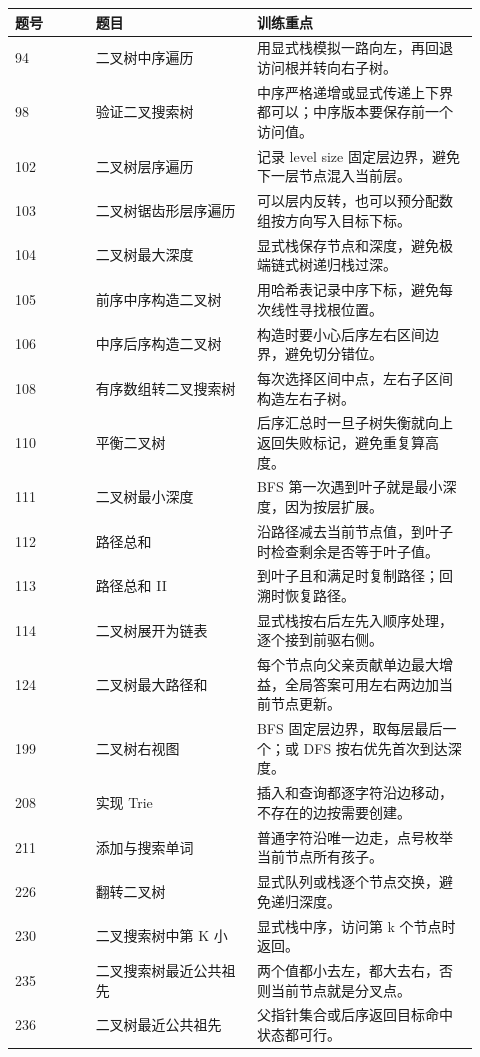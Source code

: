 \begin{longtable}{@{}p{0.16\linewidth}p{0.32\linewidth}p{0.44\linewidth}@{}}
\toprule
题号 & 题目 & 训练重点\\
\midrule
\endhead
94 & 二叉树中序遍历 & 用显式栈模拟一路向左，再回退访问根并转向右子树。\\
98 & 验证二叉搜索树 & 中序严格递增或显式传递上下界都可以；中序版本要保存前一个访问值。\\
102 & 二叉树层序遍历 & 记录 level size 固定层边界，避免下一层节点混入当前层。\\
103 & 二叉树锯齿形层序遍历 & 可以层内反转，也可以预分配数组按方向写入目标下标。\\
104 & 二叉树最大深度 & 显式栈保存节点和深度，避免极端链式树递归栈过深。\\
105 & 前序中序构造二叉树 & 用哈希表记录中序下标，避免每次线性寻找根位置。\\
106 & 中序后序构造二叉树 & 构造时要小心后序左右区间边界，避免切分错位。\\
108 & 有序数组转二叉搜索树 & 每次选择区间中点，左右子区间构造左右子树。\\
110 & 平衡二叉树 & 后序汇总时一旦子树失衡就向上返回失败标记，避免重复算高度。\\
111 & 二叉树最小深度 & BFS 第一次遇到叶子就是最小深度，因为按层扩展。\\
112 & 路径总和 & 沿路径减去当前节点值，到叶子时检查剩余是否等于叶子值。\\
113 & 路径总和 II & 到叶子且和满足时复制路径；回溯时恢复路径。\\
114 & 二叉树展开为链表 & 显式栈按右后左先入顺序处理，逐个接到前驱右侧。\\
124 & 二叉树最大路径和 & 每个节点向父亲贡献单边最大增益，全局答案可用左右两边加当前节点更新。\\
199 & 二叉树右视图 & BFS 固定层边界，取每层最后一个；或 DFS 按右优先首次到达深度。\\
208 & 实现 Trie & 插入和查询都逐字符沿边移动，不存在的边按需要创建。\\
211 & 添加与搜索单词 & 普通字符沿唯一边走，点号枚举当前节点所有孩子。\\
226 & 翻转二叉树 & 显式队列或栈逐个节点交换，避免递归深度。\\
230 & 二叉搜索树中第 K 小 & 显式栈中序，访问第 k 个节点时返回。\\
235 & 二叉搜索树最近公共祖先 & 两个值都小去左，都大去右，否则当前节点就是分叉点。\\
236 & 二叉树最近公共祖先 & 父指针集合或后序返回目标命中状态都可行。\\

\end{longtable}
